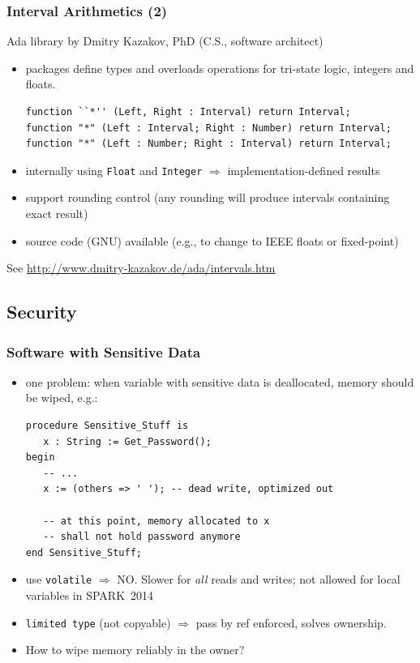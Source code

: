 \begin{frame}[fragile]
  \frametitle{Interval Arithmetics (2)}
  Ada library by Dmitry Kazakov, PhD (C.S., software architect) 
  \begin{itemize}
  \item packages define types and overloads operations for tri-state logic, integers and floats.
\begin{lstlisting}
function ``*'' (Left, Right : Interval) return Interval;
function "*" (Left : Interval; Right : Number) return Interval;
function "*" (Left : Number; Right : Interval) return Interval;
\end{lstlisting}
  \item internally using \texttt{Float} and \texttt{Integer} $\Rightarrow$ implementation-defined results
  \item support rounding control (any rounding will produce intervals containing exact result)
  \item source code (GNU) available (e.g., to change to IEEE floats or fixed-point)
  \end{itemize}
  See \url{http://www.dmitry-kazakov.de/ada/intervals.htm} 
\end{frame}

\subsection{Security}
\begin{frame}[fragile]
  \frametitle{Software with Sensitive Data}  
  \begin{itemize}
  \item one problem: when variable with sensitive data is deallocated, memory should be wiped, e.g.:
\begin{lstlisting}
procedure Sensitive_Stuff is 
   x : String := Get_Password();
begin
   -- ...
   x := (others => ' '); -- dead write, optimized out

   -- at this point, memory allocated to x 
   -- shall not hold password anymore
end Sensitive_Stuff;
\end{lstlisting}
  \item use \texttt{volatile} $\Rightarrow$ NO. Slower for \emph{all} reads and writes; not allowed for local variables in SPARK~2014
  \item \texttt{limited type} (not copyable) $\Rightarrow$ pass by ref enforced, solves ownership.
  \item How to wipe memory reliably in the owner?
  \end{itemize}
\end{frame}


